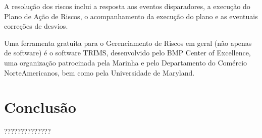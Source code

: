 \documentclass[12pt]{article}
\begin{document}
        A resolução dos riscos inclui a resposta aos eventos disparadores, a execução do Plano de Ação de Riscos, o acompanhamento da execução do plano e as eventuais correções de desvios.

        Uma ferramenta gratuita para o Gerenciamento de Riscos em geral (não apenas de software) é o software TRIMS, desenvolvido pelo BMP Center of Excellence, uma organização patrocinada pela Marinha e pelo Departamento do Comércio NorteAmericanos, bem como pela Universidade de Maryland.

    \section{Conclusão}
        ??????????????

    \nocite{*}
    
    
\end{document}
